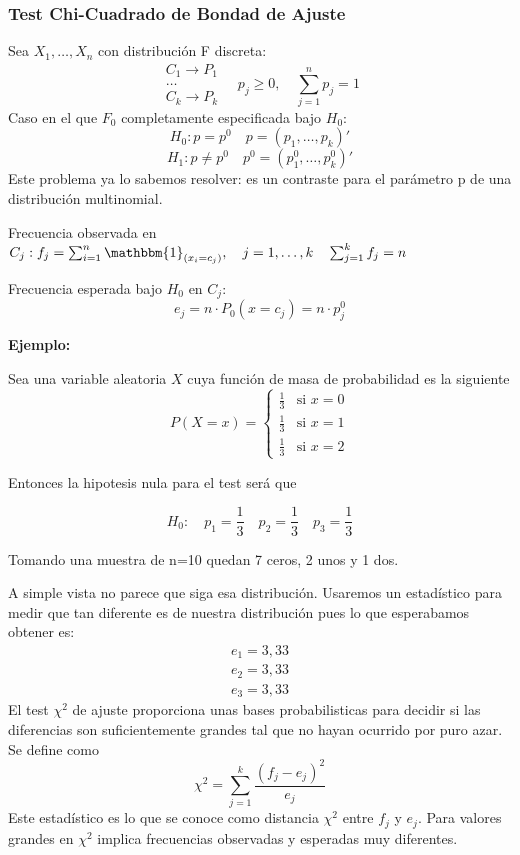\subsubsection{Test Chi-Cuadrado de Bondad de Ajuste}

Sea $X_1,\dots,X_n$ con distribución F discreta:
\[
    \begin{matrix}
        C_1 \to P_1\\
        \dots \\
        C_k \to P_k
    \end{matrix}
    \quad
    p_j \geq 0,
    \quad \sum_{j=1}^{n} p_j=1
\]
Caso en el que $F_0$ completamente especificada bajo $H_0$:
\[
    H_0: p=p^0 \quad p=(p_1,\dots,p_k)'
\]
\[
    H_1: p \neq p^0 \quad p^0=(p_1^0,\dots,p_k^0)'
\]
Este problema ya lo sabemos resolver: es un contraste para el parámetro p de una distribución multinomial.

Frecuencia observada en $C_j: f_j=\sum_{i=1}^{n} \mathbbm{1}_{(x_i=c_j)}, \quad j=1,\dots,k \quad \sum_{j=1}^{k} f_j=n$

Frecuencia esperada bajo $H_0$ en $C_j$:
\[
    e_j=n \cdot P_0(x=c_j)=n \cdot p_j^0
\]

\newpage

\textbf{Ejemplo:}

Sea una variable aleatoria $X$ cuya función de masa de probabilidad es la siguiente
\[
    P(X = x) = 
    \left\{
        \begin{matrix}
            \frac{1}{3} & \text{si } x = 0 \\[0.5em]
            \frac{1}{3} & \text{si } x = 1 \\[0.5em]
            \frac{1}{3} & \text{si } x = 2
        \end{matrix}
    \right.
\]

Entonces la hipotesis nula para el test será que

\[
    H_0:\quad p_1=\frac{1}{3} \quad p_2=\frac{1}{3} \quad p_3=\frac{1}{3}
\]

Tomando una muestra de n=10 quedan 7 ceros, 2 unos y 1 dos.

\vspace{5mm}

A simple vista no parece que siga esa distribución. Usaremos un estadístico para medir que tan diferente es de nuestra distribución pues lo que esperabamos obtener es:
\[
    \begin{matrix}
        e_1=3,33\\
        e_2=3,33\\
        e_3=3,33
    \end{matrix}
\]
El test $\chi^2$ de ajuste proporciona unas bases probabilisticas para decidir si las diferencias son suficientemente grandes tal que no hayan ocurrido por puro azar. Se define como
\[
    \chi^2=\sum_{j=1}^{k} \frac{(f_j-e_j)^2}{e_j}
\]
Este estadístico es lo que se conoce como distancia $\chi^2$ entre $f_j$ y $e_j$. Para valores grandes en $\chi^2$ implica frecuencias observadas y esperadas muy diferentes. 

